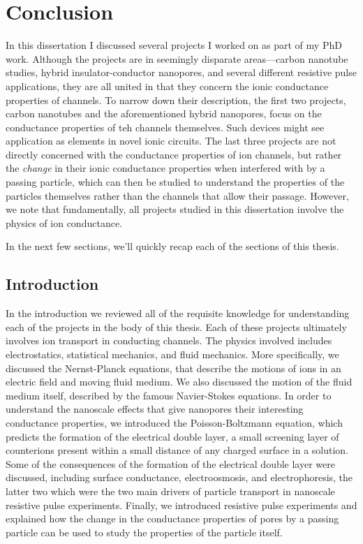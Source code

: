 \graphicspath{{../images/ch1/}}	%


\chapter{Conclusion}
\label{chap:conclusion}

In this dissertation I discussed several projects I worked on as part of my PhD work. Although the projects are in seemingly disparate areas---carbon nanotube studies, hybrid insulator-conductor nanopores, and several different resistive pulse applications, they are all united in that they concern the ionic conductance properties of channels. To narrow down their description, the first two projects, carbon nanotubes and the aforementioned hybrid nanopores, focus on the conductance properties of teh channels themselves. Such devices might see application as elements in novel ionic circuits. The last three projects are not directly concerned with the conductance properties of ion channels, but rather the \textit{change} in their ionic conductance properties when interfered with by a passing particle, which can then be studied to understand the properties of the particles themselves rather than the channels that allow their passage. However, we note that fundamentally, all projects studied in this dissertation involve the physics of ion conductance.

In the next few sections, we'll quickly recap each of the sections of this thesis.

\section{Introduction}
	
	In the introduction we reviewed all of the requisite knowledge for understanding each of the projects in the body of this thesis. Each of these projects ultimately involves ion transport in conducting channels. The physics involved includes electrostatics, statistical mechanics, and fluid mechanics. More specifically, we discussed the Nernst-Planck equations, that describe the motions of ions in an electric field and moving fluid medium. We also discussed the motion of the fluid medium itself, described by the famous Navier-Stokes equations. In order to understand the nanoscale effects that give nanopores their interesting conductance properties, we introduced the Poisson-Boltzmann equation, which predicts the formation of the electrical double layer, a small screening layer of counterions present within a small distance of any charged surface in a solution. Some of the consequences of the formation of the electrical double layer were discussed, including surface conductance, electroosmosis, and electrophoresis, the latter two which were the two main drivers of particle transport in nanoscale resistive pulse experiments. Finally, we introduced resistive pulse experiments and explained how the change in the conductance properties of pores by a passing particle can be used to study the properties of the particle itself.

